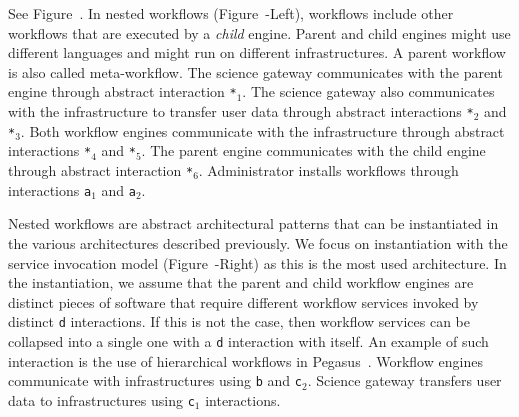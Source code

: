 \documentclass[preprint,3p,twocolumn]{elsarticle}
\begin{document}
See Figure~. In nested workflows
(Figure~-Left), workflows include other
workflows that are executed by a \emph{child} engine. Parent
and child engines might use different languages and might run on
different infrastructures. A parent workflow is
also called meta-workflow. The science gateway communicates with the
parent engine through abstract interaction \texttt{*$_1$}. The science
gateway also communicates with the infrastructure to transfer user
data through abstract interactions \texttt{*$_2$} and
\texttt{*$_3$}. Both workflow engines communicate with the
infrastructure through abstract interactions \texttt{*$_4$} and
\texttt{*$_5$}. The parent engine communicates with the child engine
through abstract interaction \texttt{*$_6$}. Administrator installs
workflows through interactions \texttt{a$_1$} and \texttt{a$_2$}.

Nested workflows are abstract architectural patterns that can be
instantiated in the various architectures described previously. We
focus on instantiation with the service invocation model
(Figure~-Right) as this is the most used
architecture. In the instantiation, we assume that the parent and
child workflow engines are distinct pieces of software that require
different workflow services invoked by distinct \texttt{d}
interactions. If this is not the case, then workflow services can be
collapsed into a single one with a \texttt{d} interaction with
itself. An example of such interaction is the use of hierarchical
workflows in Pegasus~\cite{Deelman201517}.
Workflow engines communicate with infrastructures using
\texttt{b} and \texttt{c$_2$}. Science gateway transfers user data to
infrastructures using \texttt{c$_1$} interactions.
\end{document}
